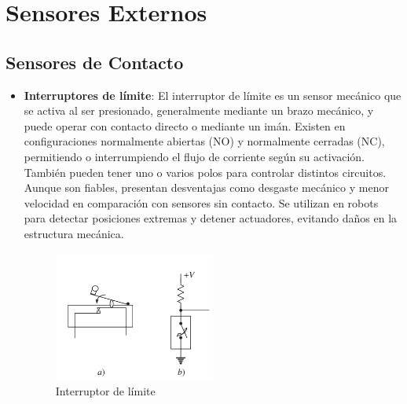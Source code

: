 \documentclass{article}
\begin{document}
	\section{Sensores Externos}
	
	\subsection{Sensores de Contacto}
	
	\begin{itemize}
		\item \textbf{Interruptores de límite}: El interruptor de límite es un sensor mecánico que se activa al ser presionado, generalmente mediante un brazo mecánico, y puede operar con contacto directo o mediante un imán. Existen en configuraciones normalmente abiertas (NO) y normalmente cerradas (NC), permitiendo o interrumpiendo el flujo de corriente según su activación. También pueden tener uno o varios polos para controlar distintos circuitos. Aunque son fiables, presentan desventajas como desgaste mecánico y menor velocidad en comparación con sensores sin contacto. Se utilizan en robots para detectar posiciones extremas y detener actuadores, evitando daños en la estructura mecánica.
		\begin{figure}[H]
			\centering
			\includegraphics[width=0.5\textwidth]{interruptordelim.png}
			\caption{Interruptor de límite}
		\end{figure}
		

\end{itemize}
\end{document}
